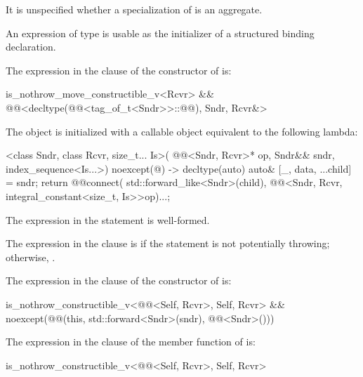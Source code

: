 \pnum
It is unspecified whether a specialization of 
is an aggregate.

\pnum
An expression of type  is usable as
the initializer of a structured binding declaration.

\pnum
The expression in the  clause of
the constructor of  is:
\begin{codeblock}
is_nothrow_move_constructible_v<Rcvr> &&
@@<decltype(@@<tag_of_t<Sndr>>::@@), Sndr, Rcvr&>
\end{codeblock}

\pnum
The object  is initialized with
a callable object equivalent to the following lambda:
\begin{itemdecl}
[]<class Sndr, class Rcvr, size_t... Is>(
  @@<Sndr, Rcvr>* op, Sndr&& sndr, index_sequence<Is...>) noexcept(@\seebelow@)
    -> decltype(auto) {
    auto& [_, data, ...child] = sndr;
    return @@{connect(
      std::forward_like<Sndr>(child),
      @@<Sndr, Rcvr, integral_constant<size_t, Is>>{op})...};
  }
\end{itemdecl}

\begin{itemdescr}
\pnum
\constraints
The expression in the  statement is well-formed.

\pnum
\remarks
The expression in the  clause is 
if the  statement is not potentially throwing;
otherwise, .
\end{itemdescr}

\pnum
The expression in the  clause of
the constructor of  is:
\begin{codeblock}
is_nothrow_constructible_v<@@<Self, Rcvr>, Self, Rcvr> &&
noexcept(@@(this, std::forward<Sndr>(sndr), @@<Sndr>()))
\end{codeblock}

\pnum
The expression in the  clause of
the  member function of  is:
\begin{codeblock}
is_nothrow_constructible_v<@@<Self, Rcvr>, Self, Rcvr>
\end{codeblock}

